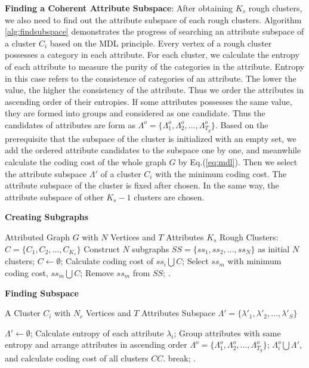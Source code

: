 \noindent \textbf{Finding a Coherent Attribute Subspace}: After obtaining $K_s$ rough clusters, we also need to find out the attribute subspace of each rough clusters. Algorithm \ref{alg:findsubspace} demonstrates the progress of searching an attribute subspace of a cluster $C_i$ based on the MDL principle. Every vertex of a rough cluster possesses a category in each attribute. For each cluster, we calculate the entropy of each attribute to measure the purity of the categories in the attribute. Entropy in this case refers to the consistence of categories of an attribute. The lower the value, the higher the consistency of the attribute. Thus we order the attributes in ascending order of their entropies. If some attributes possesses the same value, they are formed into groups and considered as one candidate. Thus the candidates of attributes are form as $\Lambda^o=\{\Lambda^o_1,\Lambda^o_2,...,\Lambda^o_{T_g} \}$. Based on the prerequisite that the subspace of the cluster is initialized with an empty set, we add the ordered attribute candidates to the subspace one by one, and meanwhile calculate the coding cost of the whole graph $G$ by Eq.(\ref{eq:mdl}). Then we select the attribute subspace $\Lambda'$ of a cluster $C_i$ with the minimum coding cost. The attribute subspace of the cluster is fixed after chosen. In the same way, the attribute subspace of other $K_s-1$ clusters are chosen.   

\begin{algorithm}[htbp]
\caption{\textbf{Creating Subgraphs}}
\label{alg:Initialization}
\begin{algorithmic}[1]
\REQUIRE
    Attributed Graph $G$ with $N$ Vertices and $T$ Attributes 
\ENSURE
    $K_s$ Rough Clusters: $C =\{C_1,C_2,...,C_{K_s}\}$
\STATE Construct $N$ subgraphs $SS = \{ss_1,ss_2,...,ss_N \}$ as initial $N$ clusters;
\STATE $C \leftarrow \emptyset$;
\STATE Calculate coding cost of $ss_i \bigcup C$;
\ENDFOR
\STATE Select $ss_m$ with minimum coding cost, $ss_m \bigcup C$;
\STATE Remove $ss_m$ from $SS$;
\ENDWHILE
{}.
\end{algorithmic}
\end{algorithm}

\begin{algorithm}[htbp]
\caption{\textbf{Finding Subspace}}
\label{alg:findsubspace}
\begin{algorithmic}[1]
\REQUIRE
    A Cluster $C_i$ with $N_c$ Vertices and $T$ Attributes
\ENSURE
    Subspace $\Lambda' = \{\lambda'_1,\lambda'_2,...,\lambda'_S \}$

\STATE $\Lambda'\leftarrow\emptyset$;
\STATE Calculate entropy of each attribute $\lambda_i$;
\ENDFOR
\STATE Group attributes with same entropy and arrange attributes in ascending order $\Lambda^o=\{\Lambda^o_1,\Lambda^o_2,...,\Lambda^o_{T_g} \}$;
\STATE $\Lambda^o_i\bigcup \Lambda'$, and calculate coding cost of all clusters $CC$.
\STATE break;
\ENDIF
\ENDFOR
{}.
\end{algorithmic}
\end{algorithm}

